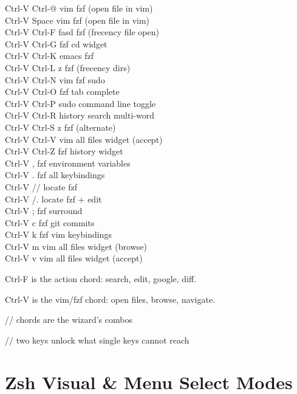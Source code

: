 \documentclass[11pt,a4paper,twoside]{book}
\begin{document}
\begin{codebox}
Ctrl-V Ctrl-@         vim fzf (open file in vim)\\
Ctrl-V Space          vim fzf (open file in vim)\\
Ctrl-V Ctrl-F         fasd fzf (frecency file open)\\
Ctrl-V Ctrl-G         fzf cd widget\\
Ctrl-V Ctrl-K         emacs fzf\\
Ctrl-V Ctrl-L         z fzf (frecency dirs)\\
Ctrl-V Ctrl-N         vim fzf sudo\\
Ctrl-V Ctrl-O         fzf tab complete\\
Ctrl-V Ctrl-P         sudo command line toggle\\
Ctrl-V Ctrl-R         history search multi-word\\
Ctrl-V Ctrl-S         z fzf (alternate)\\
Ctrl-V Ctrl-V         vim all files widget (accept)\\
Ctrl-V Ctrl-Z         fzf history widget\\
Ctrl-V ,              fzf environment variables\\
Ctrl-V .              fzf all keybindings\\
Ctrl-V //             locate fzf\\
Ctrl-V /.             locate fzf + edit\\
Ctrl-V ;              fzf surround\\
Ctrl-V c              fzf git commits\\
Ctrl-V k              fzf vim keybindings\\
Ctrl-V m              vim all files widget (browse)\\
Ctrl-V v              vim all files widget (accept)\\
\end{codebox}

Ctrl-F is the action chord: search, edit, google, diff.

Ctrl-V is the vim/fzf chord: open files, browse, navigate.

// chords are the wizard's combos

// two keys unlock what single keys cannot reach


\vspace{16pt}

\section{Zsh Visual \& Menu Select Modes}
\end{document}
